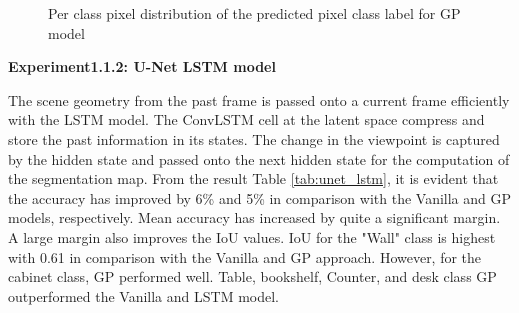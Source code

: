 	\begin{figure}%
		\centering
		\qquad
		\caption{Per class pixel distribution of the predicted pixel class label for GP model}%
		\label{fig:y_gt_and_predic_gp}%
	\end{figure}

    \newpage
	{ \bf Experiment1.1.2: U-Net LSTM model}
	
	The scene geometry from the past frame is passed onto a current frame efficiently with the LSTM model. The ConvLSTM cell at the latent space compress and store the past information in its states. The change in the viewpoint is captured by the hidden state and passed onto the next hidden state for the computation of the segmentation map. From the result Table \ref{tab:unet_lstm}, it is evident that the accuracy has improved by 6\% and 5\% in comparison with the Vanilla and GP models, respectively. Mean accuracy has increased by quite a significant margin. A large margin also improves the IoU values. IoU for the "Wall" class is highest with 0.61 in comparison with the Vanilla and GP approach. However, for the cabinet class, GP performed well. Table, bookshelf, Counter, and desk class GP outperformed the Vanilla and LSTM model. 
	

